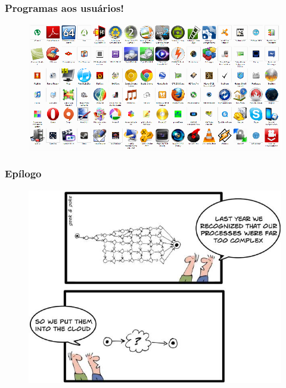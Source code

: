 \documentclass[10pt]{beamer}
\begin{document}
\begin{frame}[fragile]

\frametitle{Programas aos usuários!}

\begin{figure}[!ht]
\centering
\includegraphics[height =.65\textheight,width=.8\textwidth]
{figuras/programas.png}
\end{figure}

\end{frame}
\begin{frame}[fragile]

\frametitle{Epílogo}

\begin{figure}[!ht]
\centering
\includegraphics[height =.65\textheight,width=.8\textwidth]
{figuras/Cloud-Computing-Made-Easy.jpg}
\end{figure}

\end{frame}



\end{document}
